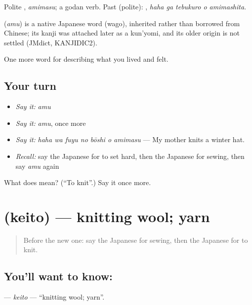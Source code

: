 Polite \textbf{}, \emph{amimasu}; a godan verb. Past (polite): \textbf{  }, \emph{haha ga tebukuro o amimashita}.

\begin{cousinweb}
\textbf{} (\emph{amu}) is a native Japanese word (wago), inherited rather than borrowed from Chinese; its kanji was attached later as a kun'yomi, and its older origin is not settled (JMdict, KANJIDIC2).
\end{cousinweb}

\begin{grammarlens}[title={What you've built}]
One more word for describing what you lived and felt.
\end{grammarlens}

\subsection*{Your turn}
\begin{itemize}
\raggedright
  \item \emph{Say it:} \emph{amu}
  \item \emph{Say it:} \emph{amu}, once more
  \item \emph{Say it:} \emph{haha wa fuyu no bōshi o amimasu} — My mother knits a winter hat.
  \item \emph{Recall:} say the Japanese for to set hard, then the Japanese for sewing, then say \emph{amu} again
\end{itemize}

\begin{tcolorbox}[breakable,colback=teal!4,colframe=teal!35!black,title={Before you move on}]
What does  mean? (\textquotedblleft{}To knit\textquotedblright{}.) Say it once more.
\end{tcolorbox}
\section[\texorpdfstring{\ja{けいと} (keito)}{けいと (keito)}]{ (keito) — knitting wool; yarn}

\label{lesson:JA-C484-keito}



\begin{quote}
Before the new one: say the Japanese for sewing, then the Japanese for to knit.
\end{quote}

\subsection*{You'll want to know: }
\textbf{} — \emph{keito} — \textquotedblleft{}knitting wool; yarn\textquotedblright{}.

